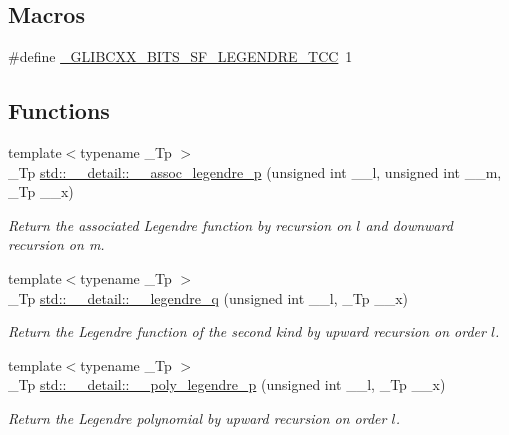 \subsection*{Macros}
\begin{DoxyCompactItemize}
\item 
\#define \hyperlink{sf__legendre_8tcc_adf9a610f8b35f611eab3b1894e967c9f}{\+\_\+\+G\+L\+I\+B\+C\+X\+X\+\_\+\+B\+I\+T\+S\+\_\+\+S\+F\+\_\+\+L\+E\+G\+E\+N\+D\+R\+E\+\_\+\+T\+CC}~1
\end{DoxyCompactItemize}
\subsection*{Functions}
\begin{DoxyCompactItemize}
\item 
{\footnotesize template$<$typename \+\_\+\+Tp $>$ }\\\+\_\+\+Tp \hyperlink{namespacestd_1_1____detail_a8b31886e334427566b1b00d71052191b}{std\+::\+\_\+\+\_\+detail\+::\+\_\+\+\_\+assoc\+\_\+legendre\+\_\+p} (unsigned int \+\_\+\+\_\+l, unsigned int \+\_\+\+\_\+m, \+\_\+\+Tp \+\_\+\+\_\+x)
\begin{DoxyCompactList}\small\item\em Return the associated Legendre function by recursion on $ l $ and downward recursion on m. \end{DoxyCompactList}\item 
{\footnotesize template$<$typename \+\_\+\+Tp $>$ }\\\+\_\+\+Tp \hyperlink{namespacestd_1_1____detail_a0643760e0d1701df4db880b2ad969055}{std\+::\+\_\+\+\_\+detail\+::\+\_\+\+\_\+legendre\+\_\+q} (unsigned int \+\_\+\+\_\+l, \+\_\+\+Tp \+\_\+\+\_\+x)
\begin{DoxyCompactList}\small\item\em Return the Legendre function of the second kind by upward recursion on order $ l $. \end{DoxyCompactList}\item 
{\footnotesize template$<$typename \+\_\+\+Tp $>$ }\\\+\_\+\+Tp \hyperlink{namespacestd_1_1____detail_ad340d3fb1a429356292e7dcf61348c8a}{std\+::\+\_\+\+\_\+detail\+::\+\_\+\+\_\+poly\+\_\+legendre\+\_\+p} (unsigned int \+\_\+\+\_\+l, \+\_\+\+Tp \+\_\+\+\_\+x)
\begin{DoxyCompactList}\small\item\em Return the Legendre polynomial by upward recursion on order $ l $. \end{DoxyCompactList}\item 

\end{DoxyCompactItemize}
